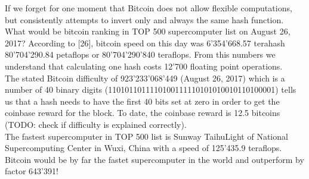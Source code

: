 If we forget for one moment that Bitcoin does not allow flexible computations, but consistently attempts to invert only and always the same hash function. What would be bitcoin ranking in TOP 500 supercomputer list on August 26, 2017? According to [26], bitcoin speed on this day was 6'354'668.57 terahash 80'704'290.84 petaflops or 80'704'290'840 teraflops. From this numbers we understand that calculating one hash costs 12'700 floating point operations. \\

The stated Bitcoin difficulty of 923'233'068'449 (August 26, 2017) which is a number of 40 binary digits (1101011011110100111110101010010110100001) tells us that a hash needs to have the first 40 bits set at zero in order to get the coinbase reward for the block. To date, the coinbase reward is 12.5 bitcoins (TODO: check if difficulty is explained correctly).\\

The fastest supercomputer in TOP 500 list is Sunway TaihuLight of National Supercomputing Center in Wuxi, China with a speed of 125'435.9 teraflops. Bitcoin would be by far the fastet supercomputer in the world and outperform by factor 643'391!
